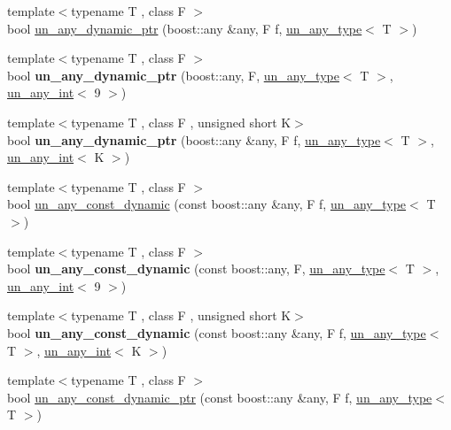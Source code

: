 \begin{DoxyCompactItemize}
\item 
{\footnotesize template$<$typename T , class F $>$ }\\bool \mbox{\hyperlink{group__boost__any__stuff_ga89921fc8079edf05986c4936cc6044e5}{un\+\_\+any\+\_\+dynamic\+\_\+ptr}} (boost\+::any \&any, F f, \mbox{\hyperlink{struct_s_m_spp__di__unipi__it_1_1un__any__type}{un\+\_\+any\+\_\+type}}$<$ T $>$)
\item 
{\footnotesize template$<$typename T , class F $>$ }\\bool {\bfseries un\+\_\+any\+\_\+dynamic\+\_\+ptr} (boost\+::any, F, \mbox{\hyperlink{struct_s_m_spp__di__unipi__it_1_1un__any__type}{un\+\_\+any\+\_\+type}}$<$ T $>$, \mbox{\hyperlink{struct_s_m_spp__di__unipi__it_1_1un__any__int}{un\+\_\+any\+\_\+int}}$<$ 9 $>$)
\item 
{\footnotesize template$<$typename T , class F , unsigned short K$>$ }\\bool {\bfseries un\+\_\+any\+\_\+dynamic\+\_\+ptr} (boost\+::any \&any, F f, \mbox{\hyperlink{struct_s_m_spp__di__unipi__it_1_1un__any__type}{un\+\_\+any\+\_\+type}}$<$ T $>$, \mbox{\hyperlink{struct_s_m_spp__di__unipi__it_1_1un__any__int}{un\+\_\+any\+\_\+int}}$<$ K $>$)
\item 
{\footnotesize template$<$typename T , class F $>$ }\\bool \mbox{\hyperlink{group__boost__any__stuff_ga4bf31c5fd006a3483e0d5311259bd9e8}{un\+\_\+any\+\_\+const\+\_\+dynamic}} (const boost\+::any \&any, F f, \mbox{\hyperlink{struct_s_m_spp__di__unipi__it_1_1un__any__type}{un\+\_\+any\+\_\+type}}$<$ T $>$)
\item 
{\footnotesize template$<$typename T , class F $>$ }\\bool {\bfseries un\+\_\+any\+\_\+const\+\_\+dynamic} (const boost\+::any, F, \mbox{\hyperlink{struct_s_m_spp__di__unipi__it_1_1un__any__type}{un\+\_\+any\+\_\+type}}$<$ T $>$, \mbox{\hyperlink{struct_s_m_spp__di__unipi__it_1_1un__any__int}{un\+\_\+any\+\_\+int}}$<$ 9 $>$)
\item 
{\footnotesize template$<$typename T , class F , unsigned short K$>$ }\\bool {\bfseries un\+\_\+any\+\_\+const\+\_\+dynamic} (const boost\+::any \&any, F f, \mbox{\hyperlink{struct_s_m_spp__di__unipi__it_1_1un__any__type}{un\+\_\+any\+\_\+type}}$<$ T $>$, \mbox{\hyperlink{struct_s_m_spp__di__unipi__it_1_1un__any__int}{un\+\_\+any\+\_\+int}}$<$ K $>$)
\item 
{\footnotesize template$<$typename T , class F $>$ }\\bool \mbox{\hyperlink{group__boost__any__stuff_ga5497c469090a3757a1e45ec10a290289}{un\+\_\+any\+\_\+const\+\_\+dynamic\+\_\+ptr}} (const boost\+::any \&any, F f, \mbox{\hyperlink{struct_s_m_spp__di__unipi__it_1_1un__any__type}{un\+\_\+any\+\_\+type}}$<$ T $>$)

\end{DoxyCompactItemize}

